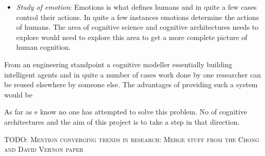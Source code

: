 \begin{itemize}

\item \emph{Study of emotion}: Emotions is what defines humans and in
  quite a few cases control their actions. In quite a few instances
  emotions determine the actions of humans. The area of cognitive
  science and cognitive architectures needs to explore would need to
  explore this area to get a more complete picture of human cognition.



\end{itemize}



From an engineering standpoint a cognitive modeller essentially
building intelligent agents and in quite a number of cases work done
by one researcher can be reused elsewhere by someone else. The
advantages of providing such a system would be


As far as e know no one has attempted to solve this problem. No of
cognitive architectures and the aim of this project is to take a step
in that direction.


\textsc{TODO: Mention converging trends in research: Merge stuff from
  the Chong and David Vernon paper}